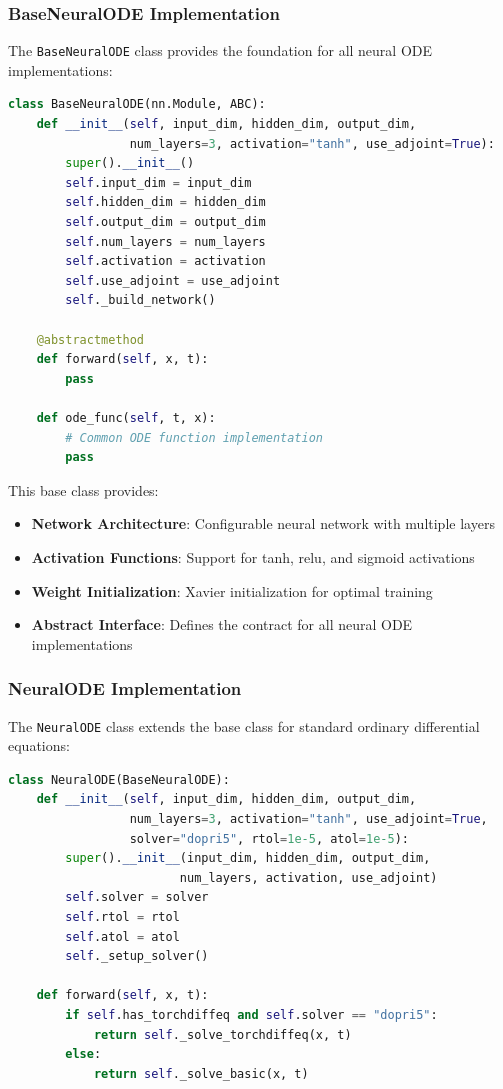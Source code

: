 \subsubsection{BaseNeuralODE Implementation}

The \texttt{BaseNeuralODE} class provides the foundation for all neural ODE implementations:

\begin{lstlisting}[language=Python, caption=BaseNeuralODE Base Class]
class BaseNeuralODE(nn.Module, ABC):
    def __init__(self, input_dim, hidden_dim, output_dim, 
                 num_layers=3, activation="tanh", use_adjoint=True):
        super().__init__()
        self.input_dim = input_dim
        self.hidden_dim = hidden_dim
        self.output_dim = output_dim
        self.num_layers = num_layers
        self.activation = activation
        self.use_adjoint = use_adjoint
        self._build_network()
    
    @abstractmethod
    def forward(self, x, t):
        pass
    
    def ode_func(self, t, x):
        # Common ODE function implementation
        pass
\end{lstlisting}

This base class provides:
\begin{itemize}
    \item \textbf{Network Architecture}: Configurable neural network with multiple layers
    \item \textbf{Activation Functions}: Support for tanh, relu, and sigmoid activations
    \item \textbf{Weight Initialization}: Xavier initialization for optimal training
    \item \textbf{Abstract Interface}: Defines the contract for all neural ODE implementations
\end{itemize}

\subsubsection{NeuralODE Implementation}

The \texttt{NeuralODE} class extends the base class for standard ordinary differential equations:

\begin{lstlisting}[language=Python, caption=NeuralODE Implementation]
class NeuralODE(BaseNeuralODE):
    def __init__(self, input_dim, hidden_dim, output_dim,
                 num_layers=3, activation="tanh", use_adjoint=True,
                 solver="dopri5", rtol=1e-5, atol=1e-5):
        super().__init__(input_dim, hidden_dim, output_dim, 
                        num_layers, activation, use_adjoint)
        self.solver = solver
        self.rtol = rtol
        self.atol = atol
        self._setup_solver()
    
    def forward(self, x, t):
        if self.has_torchdiffeq and self.solver == "dopri5":
            return self._solve_torchdiffeq(x, t)
        else:
            return self._solve_basic(x, t)
\end{lstlisting}

